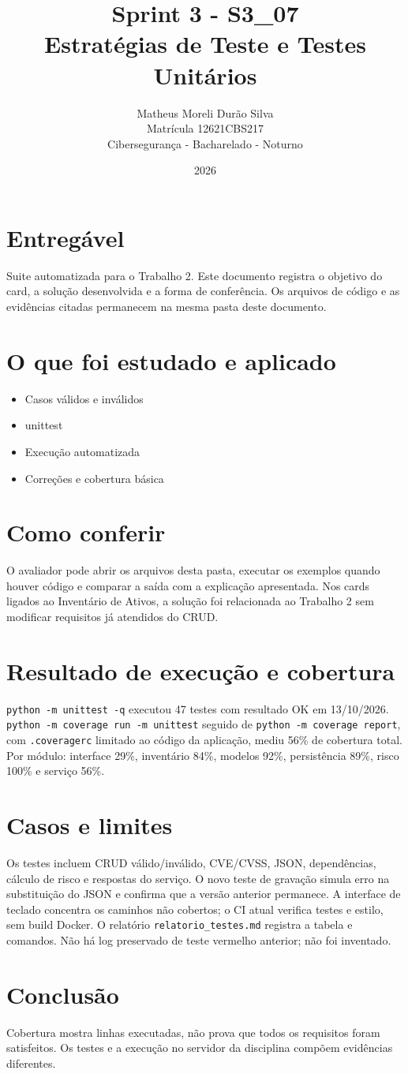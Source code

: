 \documentclass[12pt]{article}
\title{Sprint 3 - S3\_07\\Estratégias de Teste e Testes Unitários}
\author{Matheus Moreli Durão Silva\\Matrícula 12621CBS217\\Cibersegurança - Bacharelado - Noturno}
\date{2026}
\begin{document}
\maketitle

\section*{Entregável}
Suite automatizada para o Trabalho 2. Este documento registra o objetivo do card, a solução desenvolvida e a forma de conferência. Os arquivos de código e as evidências citadas permanecem na mesma pasta deste documento.

\section*{O que foi estudado e aplicado}
\begin{itemize}
\item Casos válidos e inválidos
\item unittest
\item Execução automatizada
\item Correções e cobertura básica
\end{itemize}

\section*{Como conferir}
O avaliador pode abrir os arquivos desta pasta, executar os exemplos quando houver código e comparar a saída com a explicação apresentada. Nos cards ligados ao Inventário de Ativos, a solução foi relacionada ao Trabalho 2 sem modificar requisitos já atendidos do CRUD.

\section*{Resultado de execução e cobertura}
\texttt{python -m unittest -q} executou 47 testes com resultado OK em 13/10/2026. \texttt{python -m coverage run -m unittest} seguido de \texttt{python -m coverage report}, com \texttt{.coveragerc} limitado ao código da aplicação, mediu 56\% de cobertura total. Por módulo: interface 29\%, inventário 84\%, modelos 92\%, persistência 89\%, risco 100\% e serviço 56\%.
\section*{Casos e limites}
Os testes incluem CRUD válido/inválido, CVE/CVSS, JSON, dependências, cálculo de risco e respostas do serviço. O novo teste de gravação simula erro na substituição do JSON e confirma que a versão anterior permanece. A interface de teclado concentra os caminhos não cobertos; o CI atual verifica testes e estilo, sem build Docker. O relatório \texttt{relatorio\_testes.md} registra a tabela e comandos. Não há log preservado de teste vermelho anterior; não foi inventado.
\section*{Conclusão}
Cobertura mostra linhas executadas, não prova que todos os requisitos foram satisfeitos. Os testes e a execução no servidor da disciplina compõem evidências diferentes.
\end{document}
